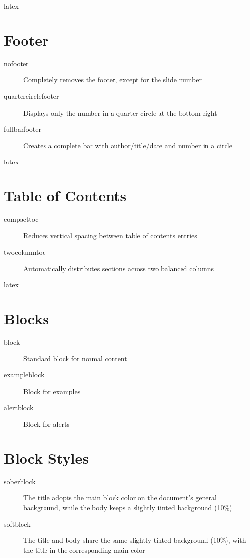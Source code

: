 \documentclass[english]{neoschool}
\begin{document}
\begin{code}{latex}
\end{code}

\section{Footer}
\begin{description}
\item[nofooter] Completely removes the footer, except for the slide number
\item[quartercirclefooter] Displays only the number in a quarter circle at the bottom right
\item[fullbarfooter] Creates a complete bar with author/title/date and number in a circle
\end{description}

\begin{code}{latex}
\end{code}

\section{Table of Contents}
\begin{description}
\item[compacttoc] Reduces vertical spacing between table of contents entries
\item[twocolumntoc] Automatically distributes sections across two balanced columns
\end{description}

\begin{code}{latex}
\end{code}

\section{Blocks}
\begin{description}
\item[block] Standard block for normal content
\item[exampleblock] Block for examples
\item[alertblock] Block for alerts
\end{description}

\section{Block Styles}
\begin{description}
\item[soberblock] The title adopts the main block color on the document's general background, while the body keeps a slightly tinted background (10\%)
\item[softblock] The title and body share the same slightly tinted background (10\%), with the title in the corresponding main color
\end{description}
\end{document}
